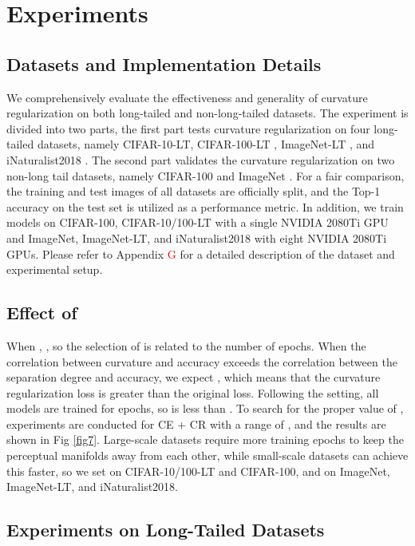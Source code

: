 \documentclass[10pt,twocolumn,letterpaper]{article}
\begin{document}
\section{Experiments}
\label{sec6}

\subsection{Datasets and Implementation Details}
\label{sec6.1}

We comprehensively evaluate the effectiveness and generality of curvature regularization on both long-tailed and non-long-tailed datasets. The experiment is divided into two parts, the first part tests curvature regularization on four long-tailed datasets, namely CIFAR-10-LT, CIFAR-100-LT \cite{paper4}, ImageNet-LT \cite{paper4,paper26}, and iNaturalist2018 \cite{paper24}. The second part validates the curvature regularization on two non-long tail datasets, namely CIFAR-100 \cite{paper25} and ImageNet \cite{paper26}. For a fair comparison, the training and test images of all datasets are officially split, and the Top-1 accuracy on the test set is utilized as a performance metric. In addition, we train models on CIFAR-100, CIFAR-10/100-LT with a single NVIDIA 2080Ti GPU and ImageNet, ImageNet-LT, and iNaturalist2018 with eight NVIDIA 2080Ti GPUs. Please refer to Appendix \textcolor{red}{G} for a detailed description of the dataset and experimental setup.

\subsection{Effect of }
\label{sec6.2}

When , , so the selection of  is related to the number of epochs. When the correlation between curvature and accuracy exceeds the correlation between the separation degree and accuracy, we expect , which means that the curvature regularization loss is greater than the original loss. Following the \cite{paper8} setting, all models are trained for  epochs, so  is less than . To search for the proper value of , experiments are conducted for CE + CR with a range of , and the results are shown in Fig \ref{fig7}. Large-scale datasets require more training epochs to keep the perceptual manifolds away from each other, while small-scale datasets can achieve this faster, so we set  on CIFAR-10/100-LT and CIFAR-100, and  on ImageNet, ImageNet-LT, and iNaturalist2018.


\subsection{Experiments on Long-Tailed Datasets}
\label{sec6.3}
\end{document}
